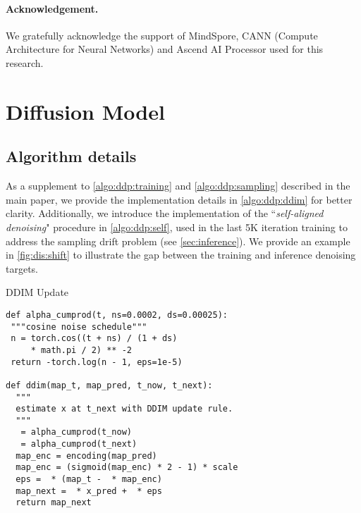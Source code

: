 \documentclass[10pt,twocolumn,letterpaper]{article}
\begin{document}
\paragraph{Acknowledgement.}
We gratefully acknowledge the support of MindSpore, CANN (Compute Architecture for Neural Networks) and Ascend AI Processor used for this research. 
{\small


}


\clearpage

\appendix

\section{Diffusion Model}
\label{supp:diffusion}

\subsection{Algorithm details}

As a supplement to \cref{algo:ddp:training} and \cref{algo:ddp:sampling}  described in the main paper, we provide the implementation details in \cref{algo:ddp:ddim} for better clarity.
Additionally, we introduce the implementation of the ``\emph{self-aligned denoising}" procedure in \cref{algo:ddp:self}, used in the last 5K iteration training to address the sampling drift problem (see \cref{sec:inference}).
We provide an example  in \cref{fig:dis:shift} to illustrate the  gap between the training and inference denoising targets.


\begin{algorithm}[t!]
\caption{DDIM Update}
\label{algo:ddp:ddim}
  
\lstset{language=Python}
\begin{lstlisting}[mathescape,xleftmargin=-1em]
def alpha_cumprod(t, ns=0.0002, ds=0.00025):
 """cosine noise schedule"""
 n = torch.cos((t + ns) / (1 + ds)
     * math.pi / 2) ** -2
 return -torch.log(n - 1, eps=1e-5)
 
def ddim(map_t, map_pred, t_now, t_next):
  """
  estimate x at t_next with DDIM update rule.
  """
   = alpha_cumprod(t_now)
   = alpha_cumprod(t_next)
  map_enc = encoding(map_pred)
  map_enc = (sigmoid(map_enc) * 2 - 1) * scale
  eps =  * (map_t -  * map_enc)
  map_next =  * x_pred +  * eps
  return map_next
\end{lstlisting}
\vspace{0.475em}
\end{algorithm}
\end{document}

